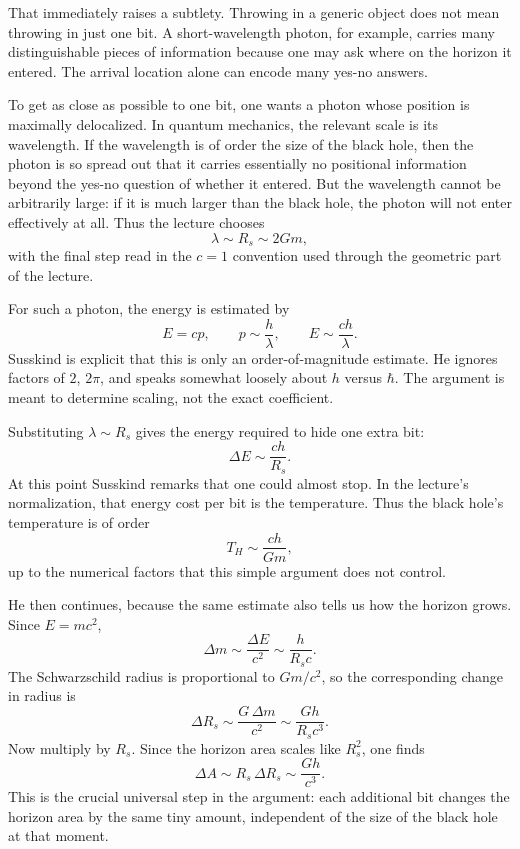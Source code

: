 That immediately raises a subtlety. Throwing in a generic object does not mean throwing in just one bit. A short-wavelength photon, for example, carries many distinguishable pieces of information because one may ask where on the horizon it entered. The arrival location alone can encode many yes-no answers.

To get as close as possible to one bit, one wants a photon whose position is maximally delocalized. In quantum mechanics, the relevant scale is its wavelength. If the wavelength is of order the size of the black hole, then the photon is so spread out that it carries essentially no positional information beyond the yes-no question of whether it entered. But the wavelength cannot be arbitrarily large: if it is much larger than the black hole, the photon will not enter effectively at all. Thus the lecture chooses
\begin{equation}
\lambda \sim R_s \sim 2Gm,
\end{equation}
with the final step read in the \(c=1\) convention used through the geometric part of the lecture.

For such a photon, the energy is estimated by
\begin{equation}
E=cp,
\qquad
p\sim \frac{h}{\lambda},
\qquad
E\sim \frac{ch}{\lambda}.
\end{equation}
Susskind is explicit that this is only an order-of-magnitude estimate. He ignores factors of \(2\), \(2\pi\), and speaks somewhat loosely about \(h\) versus \(\hbar\). The argument is meant to determine scaling, not the exact coefficient.

Substituting \(\lambda\sim R_s\) gives the energy required to hide one extra bit:
\begin{equation}
\Delta E \sim \frac{ch}{R_s}.
\end{equation}
At this point Susskind remarks that one could almost stop. In the lecture's normalization, that energy cost per bit is the temperature. Thus the black hole's temperature is of order
\begin{equation}
T_H \sim \frac{ch}{Gm},
\end{equation}
up to the numerical factors that this simple argument does not control.

He then continues, because the same estimate also tells us how the horizon grows. Since \(E=mc^2\),
\begin{equation}
\Delta m \sim \frac{\Delta E}{c^2}\sim \frac{h}{R_s c}.
\end{equation}
The Schwarzschild radius is proportional to \(Gm/c^2\), so the corresponding change in radius is
\begin{equation}
\Delta R_s \sim \frac{G\,\Delta m}{c^2}
\sim \frac{Gh}{R_s c^3}.
\end{equation}
Now multiply by \(R_s\). Since the horizon area scales like \(R_s^2\), one finds
\begin{equation}
\Delta A \sim R_s\,\Delta R_s \sim \frac{Gh}{c^3}.
\end{equation}
This is the crucial universal step in the argument: each additional bit changes the horizon area by the same tiny amount, independent of the size of the black hole at that moment.

